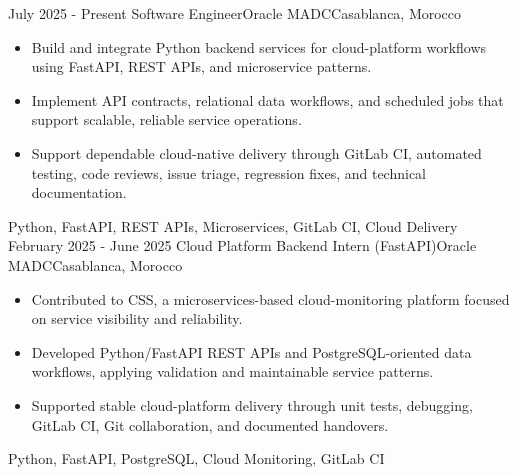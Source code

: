 
\begin{experiences}
  \experience
    {July 2025 - Present} 
    {Software Engineer}{Oracle MADC}{Casablanca, Morocco}
    {} {
      \begin{itemize}
        \item Build and integrate Python backend services for cloud-platform workflows using FastAPI, REST APIs, and microservice patterns.
        \item Implement API contracts, relational data workflows, and scheduled jobs that support scalable, reliable service operations.
        \item Support dependable cloud-native delivery through GitLab CI, automated testing, code reviews, issue triage, regression fixes, and technical documentation.
      \end{itemize}
    }
    {Python, FastAPI, REST APIs, Microservices, GitLab CI, Cloud Delivery}
  \experience
    {February 2025 - June 2025} 
    {Cloud Platform Backend Intern (FastAPI)}{Oracle MADC}{Casablanca, Morocco}
    {} {
      \begin{itemize}
        \item Contributed to CSS, a microservices-based cloud-monitoring platform focused on service visibility and reliability.
        \item Developed Python/FastAPI REST APIs and PostgreSQL-oriented data workflows, applying validation and maintainable service patterns.
        \item Supported stable cloud-platform delivery through unit tests, debugging, GitLab CI, Git collaboration, and documented handovers.
      \end{itemize}
    }
    {Python, FastAPI, PostgreSQL, Cloud Monitoring, GitLab CI}
  \emptySeparator
\end{experiences}
